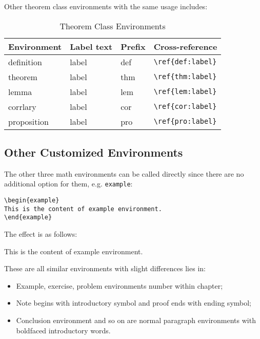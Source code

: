 \documentclass[fancy,blue,11pt]{elegantbook}
\begin{document}
Other theorem class environments with the same usage includes:

\begin{table}[htbp]
   \centering
   \caption{Theorem Class Environments}
     \begin{tabular}{llll}
     \toprule
     Environment & Label text & Prefix & Cross-reference \\
     \midrule
     definition & label & def   & \lstinline|\ref{def:label}| \\
     theorem & label & thm   & \lstinline|\ref{thm:label}| \\
     lemma & label & lem   & \lstinline|\ref{lem:label}| \\
     corrlary & label & cor   & \lstinline|\ref{cor:label}| \\
     proposition & label & pro   & \lstinline|\ref{pro:label}| \\
     \bottomrule
     \end{tabular}%
   \label{tab:theorem-class}%
 \end{table}%
 

\subsection{Other Customized Environments}
The other three math environments can be called directly since there are no additional option for them, e.g. \lstinline{example}:
\begin{lstlisting}
\begin{example}
This is the content of example environment.
\end{example}
\end{lstlisting}

The effect is as follows:

\begin{example}
This is the content of example environment.
\end{example}

These are all similar environments with slight differences lies in:

\begin{itemize}
   \item Example, exercise, problem environments number within chapter;
   \item Note begins with introductory symbol and proof ends with ending symbol;
   \item Conclusion environment and so on are normal paragraph environments with boldfaced introductory words.
\end{itemize}
\end{document}
